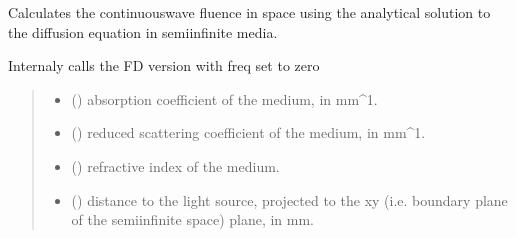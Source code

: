 \documentclass[letterpaper,10pt,english]{sphinxmanual}
\begin{document}
\begin{fulllineitems}
\label{\detokenize{_autosummary/nirfasterff.forward.analytical.semi_infinite_CW:nirfasterff.forward.analytical.semi_infinite_CW}}
\pysigstartsignatures
\pysiglinewithargsret
{}
{\sphinxparamcomma {}\sphinxparamcomma {}\sphinxparamcomma {}\sphinxparamcomma {}\sphinxparamcomma {}\sphinxparamcomma {}}
{}
\pysigstopsignatures
\sphinxAtStartPar
Calculates the continuous\sphinxhyphen{}wave fluence in space using the analytical solution to the diffusion equation in semi\sphinxhyphen{}infinite media.

\sphinxAtStartPar
Internaly calls the FD version with freq set to zero
\begin{quote}\begin{description}
\begin{itemize}
\item {} 
\sphinxAtStartPar
{} () \textendash{} absorption coefficient of the medium, in mm\textasciicircum{}\sphinxhyphen{}1.

\item {} 
\sphinxAtStartPar
{} () \textendash{} reduced scattering coefficient of the medium, in mm\textasciicircum{}\sphinxhyphen{}1.

\item {} 
\sphinxAtStartPar
{} () \textendash{} refractive index of the medium.

\item {} 
\sphinxAtStartPar
{} () \textendash{} 
\sphinxAtStartPar
distance to the light source, projected to the x\sphinxhyphen{}y (i.e. boundary plane of the semi\sphinxhyphen{}infinite space) plane, in mm.


\end{itemize}
\end{description}
\end{quote}
\end{fulllineitems}
\end{document}
